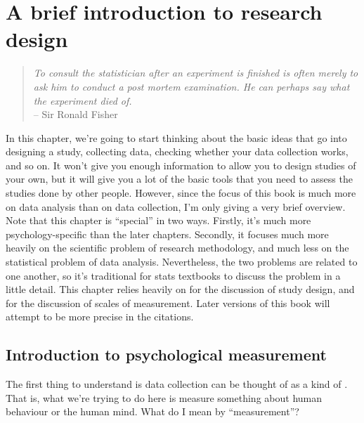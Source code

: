 

\chapter{A brief introduction to research design\label{ch:studydesign}}

\begin{quote}
{\it To consult the statistician after an experiment is finished is often merely to ask him to conduct a post mortem examination. He can perhaps say what the experiment died of.}\\
\hspace*{2cm} -- Sir Ronald Fisher
\end{quote}

In this chapter, we're going to start thinking about the basic ideas that go into designing a study, collecting data, checking whether your data collection works, and so on. It won't give you enough information to allow you to design studies of your own, but it will give you a lot of the basic tools that you need to assess the studies done by other people. However, since the focus of this book is much more on data analysis than on data collection, I'm only giving a very brief overview. Note that this chapter is ``special'' in two ways. Firstly, it's much more psychology-specific than the later chapters. Secondly, it focuses much more heavily on the scientific problem of research methodology, and much less on the statistical problem of data analysis. Nevertheless, the two problems are related to one another, so it's traditional for stats textbooks to discuss the problem in a little detail. This chapter relies heavily on \textcite{Campbell1963} for the discussion of study design, and \textcite{Stevens1946} for the discussion of scales of measurement. Later versions of this book will attempt to be more precise in the citations. 

\section{Introduction to psychological measurement~\label{sec:measurement}}

The first thing to understand is data collection can be thought of as a kind of . That is, what we're trying to do here is measure something about human behaviour or the human mind. What do I mean by ``measurement''? 

